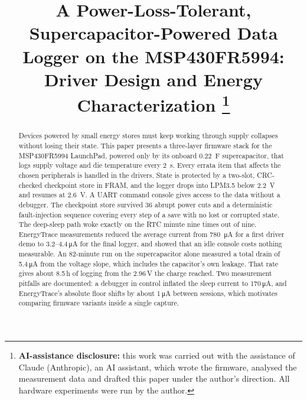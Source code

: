 \documentclass[conference]{IEEEtran}
\newcommand{\uA}{\,\si{\micro\ampere}}
\begin{document}
\title{A Power-Loss-Tolerant, Supercapacitor-Powered Data Logger on the MSP430FR5994: Driver Design and Energy Characterization%
\thanks{\textbf{AI-assistance disclosure:} this work was carried out with the assistance of Claude (Anthropic), an AI assistant, which wrote the firmware, analysed the measurement data and drafted this paper under the author's direction. All hardware experiments were run by the author.}}

\author{
}

\maketitle

\begin{abstract}
Devices powered by small energy stores must keep working through supply collapses without losing their state. This paper presents a three-layer firmware stack for the MSP430FR5994 LaunchPad, powered only by its onboard \SI{0.22}{\farad} supercapacitor, that logs supply voltage and die temperature every \SI{2}{\second}. Every errata item that affects the chosen peripherals is handled in the drivers. State is protected by a two-slot, CRC-checked checkpoint store in FRAM, and the logger drops into LPM3.5 below \SI{2.2}{\volt} and resumes at \SI{2.6}{\volt}. A UART command console gives access to the data without a debugger. The checkpoint store survived 36 abrupt power cuts and a deterministic fault-injection sequence covering every step of a save with no lost or corrupted state. The deep-sleep path woke exactly on the RTC minute nine times out of nine. EnergyTrace measurements reduced the average current from \SI{780}{\micro\ampere} for a first driver demo to 3.2--4.4\uA{} for the final logger, and showed that an idle console costs nothing measurable. An 82-minute run on the supercapacitor alone measured a total drain of 5.4\uA{} from the voltage slope, which includes the capacitor's own leakage. That rate gives about 8.5\,h of logging from the 2.96\,V the charge reached. Two measurement pitfalls are documented: a debugger in control inflated the sleep current to 170\uA, and EnergyTrace's absolute floor shifts by about 1\uA{} between sessions, which motivates comparing firmware variants inside a single capture.
\end{abstract}
\end{document}
